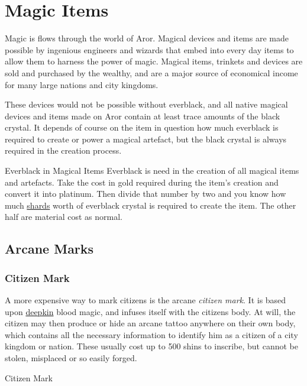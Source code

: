 \section{Magic Items}

Magic is flows through the world of Aror. Magical devices and items
are made possible by ingenious engineers and wizards that embed
 into every day items to allow them to harness
the power of magic. Magical items, trinkets and devices are sold and
purchased by the wealthy, and are a major source of economical income
for many large nations and city kingdoms.

These devices would not be possible without everblack, and all native
magical devices and items made on Aror contain at least trace amounts
of the black crystal. It depends of course on the item in question how
much everblack is required to create or power a magical artefact, but
the black crystal is always required in the creation process.

\begin{35e}{Everblack in Magical Items}
  Everblack is need in the creation of all magical items and artefacts.
  Take the cost in gold required during the item's creation and convert
  it into platinum. Then divide that number by two and you know how much
  \hyperref[sec:Shard]{shards} worth of everblack crystal is required to
  create the item. The other half are material cost as normal.
\end{35e}

\subsection{Arcane Marks}
\label{sec:Arcane Marks}

\subsubsection{Citizen Mark}
\label{sec:Citizen Mark}

A more expensive way to mark citizens is the arcane \emph{citizen mark}. It is
based upon \hyperref[sec:Deepkin]{deepkin} blood magic, and infuses itself
with the citizens body. At will, the citizen may then produce or hide an
arcane tattoo anywhere on their own body, which contains all the necessary
information to identify him as a citizen of a city kingdom or nation. These
usually cost up to 500 shins to inscribe, but cannot be stolen, misplaced or
so easily forged.

\begin{35e}{Citizen Mark}
\end{35e}

